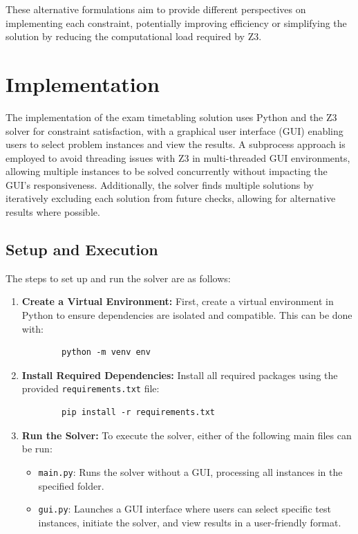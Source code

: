 \documentclass[a4paper]{article}
\begin{document}
    These alternative formulations aim to provide different perspectives on implementing each constraint, potentially improving efficiency or simplifying the solution by reducing the computational load required by Z3.    

    \section{Implementation}
    The implementation of the exam timetabling solution uses Python and the Z3 solver for constraint satisfaction, with a graphical user interface (GUI) enabling users to select problem instances and view the results. A subprocess approach is employed to avoid threading issues with Z3 in multi-threaded GUI environments, allowing multiple instances to be solved concurrently without impacting the GUI's responsiveness. Additionally, the solver finds multiple solutions by iteratively excluding each solution from future checks, allowing for alternative results where possible.
    
    \subsection{Setup and Execution}
    The steps to set up and run the solver are as follows:
    \begin{enumerate}
        \item \textbf{Create a Virtual Environment:} First, create a virtual environment in Python to ensure dependencies are isolated and compatible. This can be done with:
        \begin{verbatim}
        python -m venv env
        \end{verbatim}
    
        \item \textbf{Install Required Dependencies:} Install all required packages using the provided \texttt{requirements\allowbreak .txt} file:
        \begin{verbatim}
        pip install -r requirements.txt
        \end{verbatim}
    
        \item \textbf{Run the Solver:} To execute the solver, either of the following main files can be run:
        \begin{itemize}
            \item \texttt{main.py}: Runs the solver without a GUI, processing all instances in the specified folder.
            \item \texttt{gui.py}: Launches a GUI interface where users can select specific test instances, initiate the solver, and view results in a user-friendly format.
        \end{itemize}
    \end{enumerate}
    
\end{document}
